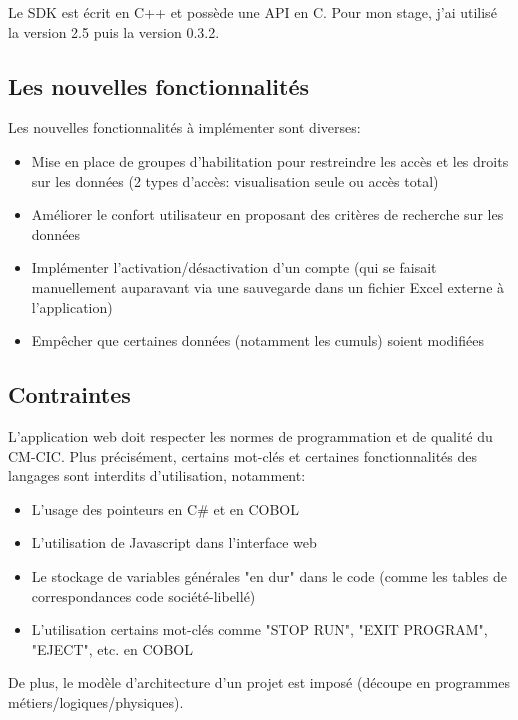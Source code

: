 \documentclass[a4paper,french,12pt]{article}
\begin{document}
			    Le SDK est écrit en C++ et possède une API en C.
			    Pour mon stage, j'ai utilisé la version 2.5 puis la version 0.3.2.
			


	\subsection{Les nouvelles fonctionnalités}
	
		Les nouvelles fonctionnalités à implémenter sont diverses:
		
		\begin{itemize}
			\item Mise en place de groupes d’habilitation pour restreindre les accès et les droits sur les données (2 types d'accès: visualisation seule ou accès total)
			\item Améliorer le confort utilisateur en proposant des critères de recherche sur les données
			\item Implémenter l’activation/désactivation d’un compte (qui se faisait manuellement auparavant via une sauvegarde dans un fichier Excel externe à l'application)
			\item Empêcher que certaines données (notamment les cumuls) soient modifiées
		\end{itemize}
		
	\subsection{Contraintes}
		
		L'application web doit respecter les normes de programmation et de qualité du CM-CIC. Plus précisément, certains mot-clés et certaines fonctionnalités des langages sont interdits d'utilisation,
		notamment:
		
		\begin{itemize}
			\item L'usage des pointeurs en C\# et en COBOL
			\item L'utilisation de Javascript dans l'interface web
			\item Le stockage de variables générales "en dur" dans le code (comme les tables de correspondances code société-libellé)
			\item L'utilisation certains mot-clés comme "STOP RUN", "EXIT PROGRAM", "EJECT", etc. en COBOL
		\end{itemize}
		
		De plus, le modèle d'architecture d'un projet est imposé (découpe en programmes métiers/logiques/physiques).
	
\end{document}
